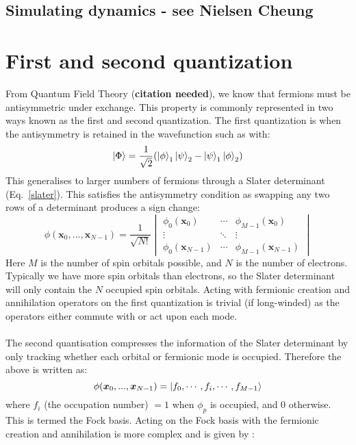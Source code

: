 \documentclass[twoside]{article}
\begin{document}
\subsection{Simulating dynamics - see Nielsen Cheung}
\section{First and second quantization}
From Quantum Field Theory (\textbf{citation needed}), we know that fermions must be antisymmetric under exchange. This property is commonly represented in two ways known as the first and second quantization. The first quantization is when the antisymmetry is retained in the wavefunction such as with:
\begin{equation}
        \ket{\Phi} = \frac{1}{\sqrt{2}}(\ket{\phi}_1 \ket{\psi}_2 - \ket{\psi}_1 \ket{\phi}_2)
\end{equation}
This generalises \cite{chemistryReview} to larger numbers of fermions through a Slater determinant (Eq.~\ref{slater}). This satisfies the antisymmetry condition as swapping any two rows of a determinant produces a sign change:
\begin{equation}\label{slater}
        \phi(\bm x_0, ..., \bm x_{N-1}) = \frac{1}{\sqrt{N!}} 
        \begin{vmatrix} 
                \phi_0(\bm x_0) & \cdots & \phi_{M-1}(\bm x_0)\\
                \vdots & \ddots & \vdots \\
                \phi_0(\bm x_{N-1}) & \cdots & \phi_{M-1}(\bm x_{N-1})
        \end{vmatrix}
\end{equation}
Here $M$ is the number of spin orbitals possible, and $N$ is the number of electrons. Typically we have more spin orbitals than electrons, so the Slater determinant will only contain the $N$ occupied spin orbitals. Acting with fermionic creation and annihilation operators on the first quantization is trivial (if long-winded) as the operators either commute with or act upon each mode. \\\\
The second quantisation compresses the information of the Slater determinant by only tracking whether each orbital or fermionic mode is occupied. Therefore the above is written as:
\begin{equation}
        \phi(\bm x_0, ..., \bm x_{N-1}) = \ket{f_0,\cdots, f_i, \cdots, f_{M-1}}
\end{equation}
where $f_i$ (the occupation number) $ =1$ when $\phi_p$ is occupied, and 0 otherwise. This is termed the Fock basis. Acting on the Fock basis with the fermionic creation and annihilation is more complex and is given by \cite{chemistryReview}:
\end{document}
